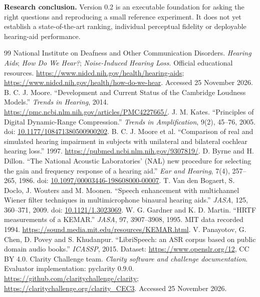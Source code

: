 \documentclass[11pt,a4paper]{article}
\begin{document}
\enlargethispage{2\baselineskip}
\textbf{Research conclusion.} Version 0.2 is an executable foundation for asking the right questions and reproducing a small reference experiment. It does not yet establish a state-of-the-art ranking, individual perceptual fidelity or deployable hearing-aid performance.
\newpage
\begin{thebibliography}{99}\small
{} National Institute on Deafness and Other Communication Disorders. \emph{Hearing Aids}; \emph{How Do We Hear?}; \emph{Noise-Induced Hearing Loss}. Official educational resources. \url{https://www.nidcd.nih.gov/health/hearing-aids}; \url{https://www.nidcd.nih.gov/health/how-do-we-hear}. Accessed 25 November 2026.
 B. C. J. Moore. ``Development and Current Status of the Cambridge Loudness Models.'' \emph{Trends in Hearing}, 2014. \url{https://pmc.ncbi.nlm.nih.gov/articles/PMC4227665/}.
 J. M. Kates. ``Principles of Digital Dynamic-Range Compression.'' \emph{Trends in Amplification}, 9(2), 45--76, 2005. doi: \href{https://doi.org/10.1177/108471380500900202}{10.1177/108471380500900202}.
 B. C. J. Moore et al. ``Comparison of real and simulated hearing impairment in subjects with unilateral and bilateral cochlear hearing loss.'' 1997. \url{https://pubmed.ncbi.nlm.nih.gov/9307819/}.
 D. Byrne and H. Dillon. ``The National Acoustic Laboratories' (NAL) new procedure for selecting the gain and frequency response of a hearing aid.'' \emph{Ear and Hearing}, 7(4), 257--265, 1986. doi: \href{https://doi.org/10.1097/00003446-198608000-00007}{10.1097/00003446-198608000-00007}.
 T. Van den Bogaert, S. Doclo, J. Wouters and M. Moonen. ``Speech enhancement with multichannel Wiener filter techniques in multimicrophone binaural hearing aids.'' \emph{JASA}, 125, 360--371, 2009. doi: \href{https://doi.org/10.1121/1.3023069}{10.1121/1.3023069}.
 W. G. Gardner and K. D. Martin. ``HRTF measurements of a KEMAR.'' \emph{JASA}, 97, 3907--3908, 1995. MIT data recorded 1994. \url{https://sound.media.mit.edu/resources/KEMAR.html}.
 V. Panayotov, G. Chen, D. Povey and S. Khudanpur. ``LibriSpeech: an ASR corpus based on public domain audio books.'' \emph{ICASSP}, 2015. Dataset: \url{https://www.openslr.org/12}, CC BY 4.0.
 Clarity Challenge team. \emph{Clarity software and challenge documentation}. Evaluator implementation: pyclarity 0.9.0. \url{https://github.com/claritychallenge/clarity}; \url{https://claritychallenge.org/clarity_CEC3}. Accessed 25 November 2026.

\end{thebibliography}
\end{document}
